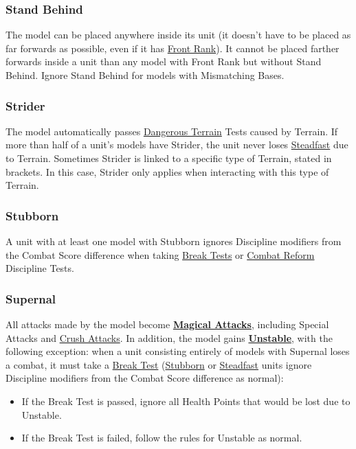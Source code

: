 \subsubsection{Stand Behind}
\idx[main=y]{\standbehind}\label{stand_behind}

The model can be placed anywhere inside its unit (it doesn't have to be placed as far forwards as possible, even if it has \hyperref[front_rank]{Front Rank}). It cannot be placed farther forwards inside a unit than any model with Front Rank but without Stand Behind. Ignore Stand Behind for models with Mismatching Bases.

\subsubsection{Strider}
\idx[main=y]{\strider{}}\label{strider}

The model automatically passes \hyperref[dangerous_terrain]{Dangerous Terrain} Tests caused by Terrain. If more than half of a unit's models have Strider, the unit never loses \hyperref[steadfast]{Steadfast} due to Terrain. Sometimes Strider is linked to a specific type of Terrain, stated in brackets. In this case, Strider only applies when interacting with this type of Terrain.

\subsubsection{Stubborn}
\idx[main=y]{\stubborn}\label{stubborn}

A unit with at least one model with Stubborn ignores Discipline modifiers from the Combat Score difference when taking \hyperref[break_test]{Break Tests} or \hyperref[combat_reform]{Combat Reform} Discipline Tests.

\subsubsection{Supernal}
\idx[main=y]{\supernal}\label{supernal}

All attacks made by the model become \hyperref[magical_attacks]{\textbf{Magical Attacks}}, including Special Attacks and \hyperref[crush_attack]{Crush Attacks}. In addition, the model gains \hyperref[unstable]{\textbf{Unstable}}, with the following exception: when a unit consisting entirely of models with Supernal loses a combat, it must take a \hyperref[break_test]{Break Test} (\hyperref[stubborn]{Stubborn} or \hyperref[steadfast]{Steadfast} units ignore Discipline modifiers from the Combat Score difference as normal):
\begin{itemize}
\item If the Break Test is passed, ignore all Health Points that would be lost due to Unstable.
\item If the Break Test is failed, follow the rules for Unstable as normal.
\end{itemize}

